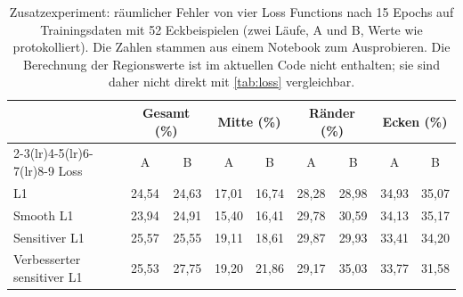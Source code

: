 \begin{table}[htbp]
  \centering
  \caption[Zusatzexperiment: räumlicher Fehler von vier Loss Functions]{Zusatzexperiment: räumlicher Fehler von vier Loss Functions nach
           15 Epochs auf Trainingsdaten mit 52 Eckbeispielen (zwei Läufe, A
           und B, Werte wie protokolliert). Die Zahlen stammen aus einem
           Notebook zum Ausprobieren. Die Berechnung der Regionswerte ist im
           aktuellen Code nicht enthalten; sie sind daher nicht direkt mit
           \cref{tab:loss} vergleichbar.}
  \label{tab:loss_aux}
  \small
  \setlength{\tabcolsep}{5pt}
  \begin{tabular}{l cc cc cc cc}
    \toprule
    & \multicolumn{2}{c}{Gesamt (\%)} & \multicolumn{2}{c}{Mitte (\%)}
    & \multicolumn{2}{c}{Ränder (\%)} & \multicolumn{2}{c}{Ecken (\%)} \\
    \cmidrule(lr){2-3}\cmidrule(lr){4-5}\cmidrule(lr){6-7}\cmidrule(lr){8-9}
    Loss & A & B & A & B & A & B & A & B \\
    \midrule
    L1                                & 24,54 & 24,63 & 17,01 & 16,74 & 28,28 & 28,98 & 34,93 & 35,07 \\
    Smooth L1                         & 23,94 & 24,91 & 15,40 & 16,41 & 29,78 & 30,59 & 34,13 & 35,17 \\
    Sensitiver L1                     & 25,57 & 25,55 & 19,11 & 18,61 & 29,87 & 29,93 & 33,41 & 34,20 \\
    Verbesserter sensitiver L1        & 25,53 & 27,75 & 19,20 & 21,86 & 29,17 & 35,03 & 33,77 & 31,58 \\
    \bottomrule
  \end{tabular}
\end{table}

